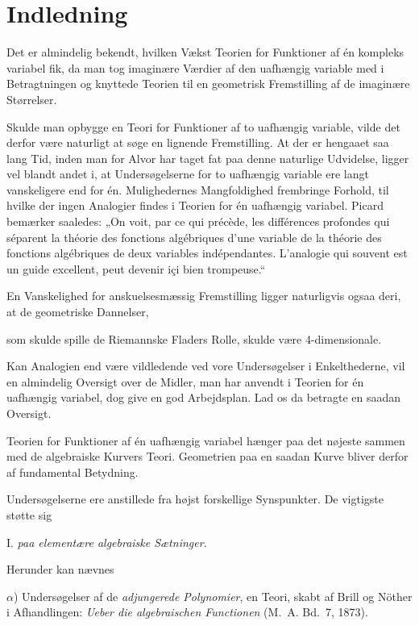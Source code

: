 \documentclass{article}
\begin{document}
\section*{Indledning}

Det er almindelig bekendt, hvilken Vækst Teorien for Funktioner af én kompleks variabel fik, da man tog imaginære Værdier af den uafhængig variable med i Betragtningen og knyttede Teorien til en geometrisk Fremstilling af de imaginære Størrelser.

Skulde man opbygge en Teori for Funktioner af to uafhængig variable, vilde det derfor være naturligt at søge en lignende Fremstilling. At der er hengaaet saa lang Tid, inden man for Alvor har taget fat paa denne naturlige Udvidelse, ligger vel blandt andet i, at Undersøgelserne for to uafhængig variable ere langt vanskeligere end for én. Mulighedernes Mangfoldighed frembringe Forhold, til hvilke der ingen Analogier findes i Teorien for én uafhængig variabel. Picard bemærker saaledes: „On voit, par ce qui précède, les différences profondes qui séparent la théorie des fonctions algébriques d'une variable de la théorie des fonctions algébriques de deux variables indépendantes. L'analogie qui souvent est un guide excellent, peut devenir içi bien trompeuse.“

En Vanskelighed for anskuelsesmæssig Fremstilling ligger naturligvis ogsaa deri, at de geometriske Dannelser,

som skulde spille de Riemannske Fladers Rolle, skulde være 4-dimensionale.

Kan Analogien end være vildledende ved vore Undersøgelser i Enkelthederne, vil en almindelig Oversigt over de Midler, man har anvendt i Teorien for én uafhængig variabel, dog give en god Arbejdsplan. Lad os da betragte en saadan Oversigt.

Teorien for Funktioner af én uafhængig variabel hænger paa det nøjeste sammen med de algebraiske Kurvers Teori. Geometrien paa en saadan Kurve bliver derfor af fundamental Betydning.

Undersøgelserne ere anstillede fra højst forskellige Synspunkter. De vigtigste støtte sig

I. \emph{paa elementære algebraiske Sætninger.}

Herunder kan nævnes

$\alpha$) Undersøgelser af de \emph{adjungerede Polynomier}, en Teori, skabt af Brill og Nöther i Afhandlingen: \emph{Ueber die algebraischen Functionen} (M.~A. Bd.~7, 1873).
\end{document}
